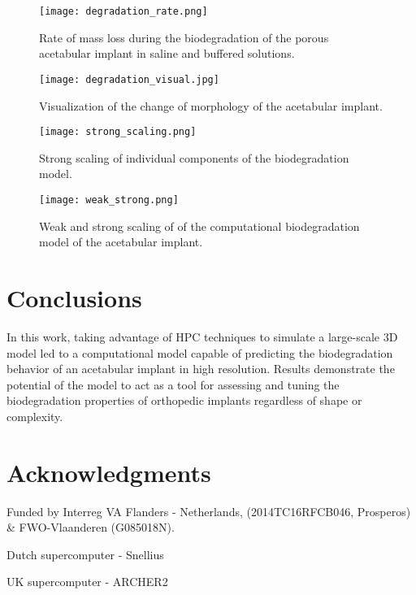 \begin{figure}[h]
\centering
\medskip
\texttt{[image: degradation\_rate.png]}
\caption[Biodegradation rate for the acetabular implant]{Rate of mass loss during the biodegradation of the porous acetabular implant in saline and buffered solutions.} \label{fig:cup_degradation_rate}
\end{figure}

\begin{figure}[h]
\centering
\medskip
\texttt{[image: degradation\_visual.jpg]}
\caption[Visualization of the change of morphology of the acetabular implant]{Visualization of the change of morphology of the acetabular implant.} \label{fig:cup_degradation_visual}
\end{figure}

\begin{figure}[h]
\centering
\medskip
\texttt{[image: strong\_scaling.png]}
\caption[Strong scaling of individual components of the biodegradation model]{Strong scaling of individual components of the biodegradation model.} \label{fig:cup_strong_scaling}
\end{figure}


\begin{figure}[h]
\centering
\medskip
\texttt{[image: weak\_strong.png]}
\caption[Weak and strong scaling of of the acetabular implant model]{Weak and strong scaling of of the computational biodegradation model of the acetabular implant.} \label{fig:cup_weak_strong}
\end{figure}

\section{Conclusions}

In this work, taking advantage of HPC techniques to simulate a large-scale 3D model led to a computational model capable of predicting the biodegradation behavior of an acetabular implant in high resolution. Results demonstrate the potential of the model to act as a tool for assessing and tuning the biodegradation properties of orthopedic  implants regardless of shape or complexity.

\section{Acknowledgments}

Funded by Interreg VA Flanders - Netherlands, (2014TC16RFCB046, Prosperos) \& FWO-Vlaanderen (G085018N).

Dutch supercomputer - Snellius

UK supercomputer - ARCHER2


\cleardoublepage


